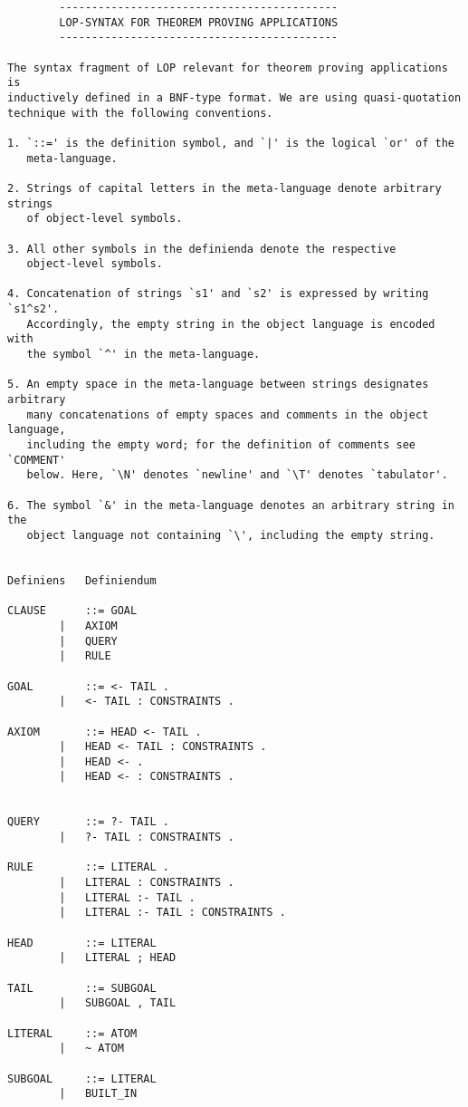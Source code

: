 \begin{verbatim}
		-------------------------------------------
		LOP-SYNTAX FOR THEOREM PROVING APPLICATIONS 
		-------------------------------------------

The syntax fragment of LOP relevant for theorem proving applications is 
inductively defined in a BNF-type format. We are using quasi-quotation 
technique with the following conventions. 

1. `::=' is the definition symbol, and `|' is the logical `or' of the 
   meta-language. 
   
2. Strings of capital letters in the meta-language denote arbitrary strings 
   of object-level symbols. 
   
3. All other symbols in the definienda denote the respective 
   object-level symbols.

4. Concatenation of strings `s1' and `s2' is expressed by writing `s1^s2'.
   Accordingly, the empty string in the object language is encoded with 
   the symbol `^' in the meta-language. 
   
5. An empty space in the meta-language between strings designates arbitrary 
   many concatenations of empty spaces and comments in the object language,   
   including the empty word; for the definition of comments see `COMMENT' 
   below. Here, `\N' denotes `newline' and `\T' denotes `tabulator'.

6. The symbol `&' in the meta-language denotes an arbitrary string in the 
   object language not containing `\', including the empty string.


Definiens	Definiendum		

CLAUSE		::= GOAL     
		|   AXIOM  
		|   QUERY    
		|   RULE     

GOAL		::= <- TAIL .
		|   <- TAIL : CONSTRAINTS .

AXIOM		::= HEAD <- TAIL . 
		|   HEAD <- TAIL : CONSTRAINTS .
		|   HEAD <- .  
		|   HEAD <- : CONSTRAINTS .


QUERY		::= ?- TAIL .
		|   ?- TAIL : CONSTRAINTS .

RULE		::= LITERAL .
		|   LITERAL : CONSTRAINTS .
		|   LITERAL :- TAIL .
		|   LITERAL :- TAIL : CONSTRAINTS .

HEAD		::= LITERAL 
		|   LITERAL ; HEAD

TAIL		::= SUBGOAL
		|   SUBGOAL , TAIL

LITERAL		::= ATOM
		|   ~ ATOM

SUBGOAL		::= LITERAL
		|   BUILT_IN


\end{verbatim}
